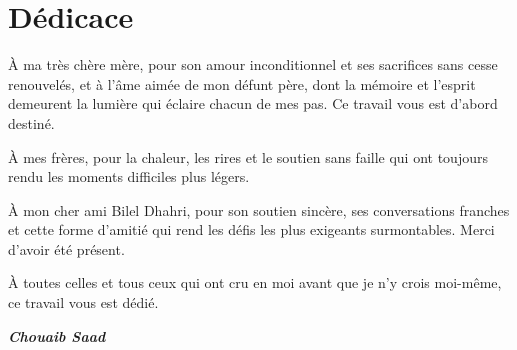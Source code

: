 \chapter*{Dédicace}
\thispagestyle{empty}

\vspace*{3cm}

\begin{center}
\begin{minipage}{0.82\textwidth}
\setlength{\parskip}{1.4ex}
\itshape

\par À ma très chère mère, pour son amour inconditionnel et ses sacrifices
sans cesse renouvelés, et à l'âme aimée de mon défunt père, dont la
mémoire et l'esprit demeurent la lumière qui éclaire chacun de mes pas.
Ce travail vous est d'abord destiné.

\bigskip

\par À mes frères, pour la chaleur, les rires et le soutien sans faille
qui ont toujours rendu les moments difficiles plus légers.

\bigskip

\par À mon cher ami Bilel Dhahri, pour son soutien sincère, ses
conversations franches et cette forme d'amitié qui rend les défis les plus
exigeants surmontables. Merci d'avoir été présent.

\bigskip

\par À toutes celles et tous ceux qui ont cru en moi avant que je n'y
crois moi-même, ce travail vous est dédié.

\bigskip\bigskip

\begin{flushright}
\textit{\textbf{Chouaib Saad}}
\end{flushright}

\end{minipage}
\end{center}